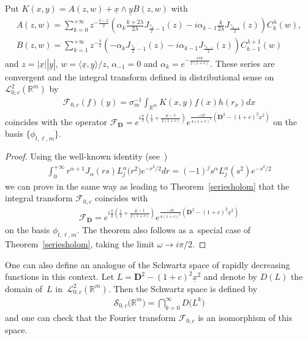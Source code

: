 \documentclass[pdftex]{sigma}
\numberwithin{equation}{section}
\numberwithin{theorem}{section}
\numberwithin{proposition}{section}
\numberwithin{lemma}{section}
\numberwithin{corollary}{section}
\numberwithin{definition}{section}
\numberwithin{example}{section}
\numberwithin{remark}{section}
\numberwithin{note}{section}
\theoremstyle{remark}
\newcommand{\mR}{\mathbb{R}}
\newcommand{\cF}{\mathcal{F}}
\newcommand{\cS}{\mathcal{S}}
\newcommand{\cL}{\mathcal{L}}
\newcommand{\dD}{\textbf{D}}
\newcommand{\ux}{\underline{x}}
\newcommand{\uy}{\underline{y}}
\def\a{{\alpha}}
\def\l{{\lambda}}
\def\o{{\omega}}
\def\la{{\langle}}
\def\ra{{\rangle}}
\begin{document}
\begin{theorem}
\label{seriesrepr}
Put $K(x,y)=A(z,w)+\ux\wedge\uy B(z,w)$ with
\begin{gather*}
A(z,w) = \sum_{k=0}^{+\infty} z^{-\frac{\delta-2}{2}} \left(\alpha_{k} \frac{k+2\l}{2\l}
J_{\frac{\gamma_{k}}{2}-1}(z) -i \alpha_{k-1} \frac{k}{2\l} J_{\frac{\gamma_{k-1}}{2}}(z)\right)
C_{k}^{\l}(w),\\
B(z,w) = \sum_{k=1}^{+\infty} z^{-\frac{\delta}{2}} \left(-\alpha_{k}
J_{\frac{\gamma_{k}}{2}-1}(z) -i \alpha_{k-1} J_{\frac{\gamma_{k-1}}{2}}(z)\right)
C_{k-1}^{\l+1}(w)
\end{gather*}
and $z=|\ux||\uy|$, $w=\la\ux,\uy\ra/z$, $\alpha_{-1}=0$ and $\alpha_{k}=e^{-\frac{i\pi
k}{2(1+c)}}$.
These series are convergent and the integral transform defined in distributional sense on
$\cL^{2}_{0,c}(\mR^{m})$ by
\begin{gather*}
\cF_{0,c}(f)(y)=\sigma_{m}^{-1}\int_{\mR^{m}}K(x,y)f(x)h(r_{x})dx
\end{gather*}
coincides with the operator $\cF_{\dD}=e^{i\frac{\pi}{2}\left(\frac{1}{2}+\frac{\mu-
1}{2(1+c)}\right)}e^{\frac{-i\pi}{4(1+c)^{2}}\left(\dD^{2}-(1+c)^{2}\ux^{2}\right)}$
on the basis $\{\phi_{t,\ell,m}\}$.
\end{theorem}

\begin{proof}
Using the well-known identity (see~\cite[Exercise 21, p.~371]{Sz})
\begin{gather*}
\int_{0}^{+\infty}r^{\alpha+1}J_{\a}(rs)L_{j}^{\a}\big(r^{2}\big)e^{-r^{2}/2}dr=(-1)^{j}s^{\a}
L_{j}^{\a}(s^{2})e^{-s^{2}/2}
\end{gather*}
we can prove in the same way as leading to Theorem~\ref{seriesholom} that the integral transform
$\cF_{0,c}$ coincides with
\begin{gather*}
\cF_{\dD}=e^{i\frac{\pi}{2}\left(\frac{1}{2}+\frac{\mu-1}{2(1+c)}\right)}e^{\frac{-i\pi}{
4(1+c)^{2}}\left(\dD^{2}-(1+c)^{2}\ux^{2}\right)}
\end{gather*}
on the basis $\phi_{t,\ell,m}$.
The theorem also follows as a~special case of Theorem~\ref{seriesholom}, taking the limit $\o
\rightarrow i\pi/2$.
\end{proof}

\begin{remark}
One can also def\/ine an analogue of the Schwartz space of rapidly decreasing functions in this
context.
Let $L=\dD^{2}-(1+c)^{2}\ux^{2}$ and denote by $D(L)$ the domain of~$L$ in~$\cL^{2}_{0,c}(\mR^{m})$.
Then the Schwartz space is def\/ined by
\begin{gather*}
\cS_{0,c}\big(\mR^{m}\big)=\bigcap_{k=0}^{\infty}D\big(L^{k}\big)
\end{gather*}
and one can check that the Fourier transform $\cF_{0,c}$ is an isomorphism of this space.
\end{remark}
\end{document}
